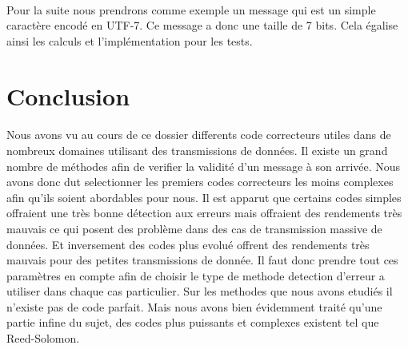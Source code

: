 \documentclass[a4paper,11pt]{report}
\begin{document}
        \paragraph{}
Pour la suite nous prendrons comme exemple un message qui est un simple caractère encodé en UTF-7.
Ce message a donc une taille de 7 bits.
Cela égalise ainsi les calculs et l'implémentation pour les tests.
    \clearpage

    
    \clearpage

    
    \clearpage

    
    \clearpage

    
    \clearpage

    \section{Conclusion}
        \paragraph{}
Nous avons vu au cours de ce dossier differents code correcteurs utiles dans de nombreux domaines utilisant des transmissions de données.
Il existe un grand nombre de méthodes afin de verifier la validité d'un message à son arrivée.
Nous avons donc dut selectionner les premiers codes correcteurs les moins complexes afin qu'ils soient abordables pour nous.
Il est apparut que certains codes simples offraient une très bonne détection aux erreurs mais offraient des rendements très mauvais ce qui posent des problème dans des cas de transmission massive de données.
Et inversement des codes plus evolué offrent des rendements très mauvais pour des petites transmissions de donnée.
Il faut donc prendre tout ces paramètres en compte afin de choisir le type de methode detection d'erreur a utiliser dans chaque cas particulier.
Sur les methodes que nous avons etudiés il n'existe pas de code parfait.
Mais nous avons bien évidemment traité qu'une partie infine du sujet,
des codes plus puissants et complexes existent tel que Reed-Solomon.
    \clearpage

    \begin{abstract} %
    \end{abstract}
    \clearpage

    
    \clearpage

    \clearpage
\end{document}
